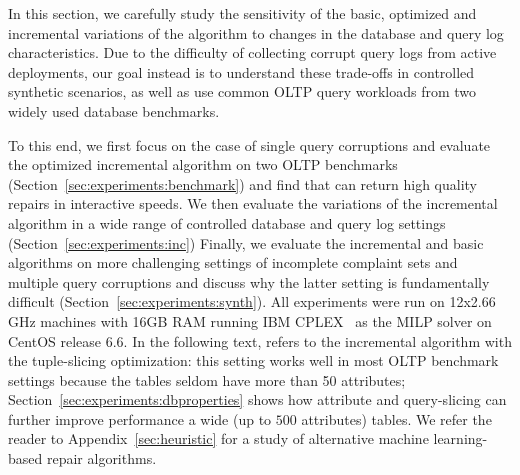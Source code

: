 In this section, we carefully study the sensitivity of the
basic, optimized and incremental variations of the \sys algorithm 
to changes in the database and query log characteristics.
Due to the difficulty of collecting corrupt query logs from active deployments, 
our goal instead is to understand these trade-offs in
controlled synthetic scenarios, as well as use common OLTP query workloads
from two widely used database benchmarks.

To this end, we first focus on the case of single query corruptions and evaluate
the optimized \sys incremental algorithm on two OLTP benchmarks (Section~\ref{sec:experiments:benchmark}) and find that \sys can return high quality repairs in interactive speeds.
We then evaluate the variations of the incremental algorithm in a wide range of controlled database and query log settings (Section~\ref{sec:experiments:inc})
Finally, we evaluate the incremental and basic algorithms on more challenging settings of incomplete complaint sets and multiple query corruptions and discuss why the latter setting is fundamentally difficult (Section~\ref{sec:experiments:synth}).
All experiments were run on 12x2.66 GHz  machines with 16GB RAM running IBM CPLEX~\cite{cplex2014v12} as the MILP solver on CentOS release 6.6.
In the following text, \sys refers to the incremental algorithm with the tuple-slicing optimization: this setting works well in most OLTP benchmark settings because the tables
seldom have more than 50 attributes; Section~\ref{sec:experiments:dbproperties} shows how attribute and query-slicing can further improve performance a wide (up to $500$ attributes) tables.
We refer the reader to Appendix~\ref{sec:heuristic} for a study of alternative machine learning-based repair algorithms.

 

 

